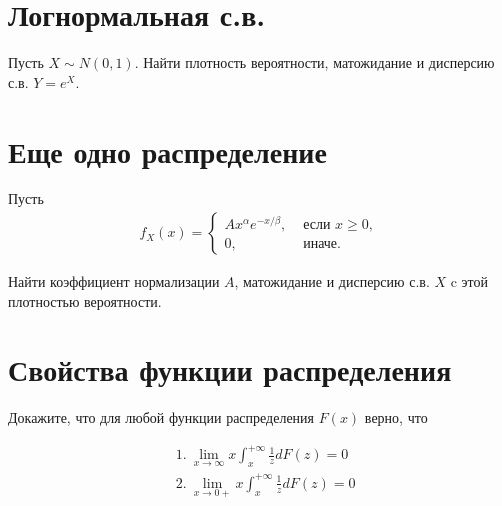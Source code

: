 \documentclass[12pt]{article}
\begin{document}
\section{Логнормальная с.в.}

Пусть $X \sim N(0, 1)$. Найти плотность вероятности, матожидание и дисперсию с.в. $Y = e^X$.

\section{Еще одно распределение}

Пусть 
\begin{align*}
    f_X(x) = \begin{cases}
        Ax^\alpha e^{-x/\beta}, &\text{ если } x \ge 0, \\
        0, &\text{ иначе.}
    \end{cases}
\end{align*}

Найти коэффициент нормализации $A$, матожидание и дисперсию с.в. $X$ c этой плотностью вероятности.

\section{Свойства функции распределения}

Докажите, что для любой функции распределения $F(x)$ верно, что

\begin{align*}
    &1.\ \lim_{x \to \infty} x\int_x^{+\infty} \frac{1}{z} d F(z) = 0 \\
    &2.\ \lim_{x \to 0+} x\int_x^{+\infty} \frac{1}{z} d F(z) = 0 \\
\end{align*}
\end{document}

